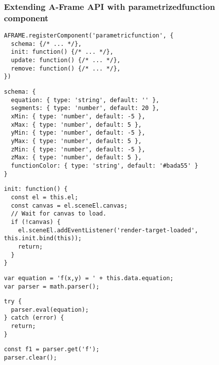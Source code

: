 \subsubsection{Extending A-Frame API with parametrizedfunction component}


\begin{lstlisting}[caption={Registering new A-Frame component \texttt{'parametricfunction'}.},captionpos=b]
AFRAME.registerComponent('parametricfunction', {
  schema: {/* ... */}, 
  init: function() {/* ... */},
  update: function() {/* ... */},
  remove: function() {/* ... */},
})
\end{lstlisting}

\begin{lstlisting}[caption={\texttt{parametricfunction} A-Frame component schema with default values.},captionpos=b]
schema: {
  equation: { type: 'string', default: '' },
  segments: { type: 'number', default: 20 },
  xMin: { type: 'number', default: -5 },
  xMax: { type: 'number', default: 5 },
  yMin: { type: 'number', default: -5 },
  yMax: { type: 'number', default: 5 },
  zMin: { type: 'number', default: -5 },
  zMax: { type: 'number', default: 5 },
  functionColor: { type: 'string', default: '#bada55' }
}
\end{lstlisting}

\begin{lstlisting}[caption={\texttt{parametricfunction} A-Frame component init function.},captionpos=b]
init: function() {
  const el = this.el;
  const canvas = el.sceneEl.canvas;
  // Wait for canvas to load.
  if (!canvas) {
    el.sceneEl.addEventListener('render-target-loaded', this.init.bind(this));
    return;
  }
}
\end{lstlisting}

\begin{lstlisting}[caption={\texttt{parametricfunction} A-Frame component init function.},captionpos=b]
var equation = 'f(x,y) = ' + this.data.equation;
var parser = math.parser();
\end{lstlisting}

\begin{lstlisting}[caption={\texttt{parametricfunction} A-Frame component init function.},captionpos=b]
try {
  parser.eval(equation);
} catch (error) {
  return;
}
\end{lstlisting}

\begin{lstlisting}[caption={\texttt{parametricfunction} A-Frame component init function.},captionpos=b]
const f1 = parser.get('f');
parser.clear();
\end{lstlisting}

